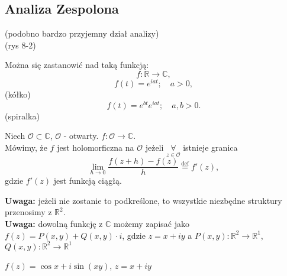 \documentclass[../main.tex]{subfiles}
\begin{document}
\subsection{Analiza Zespolona}
(podobno bardzo przyjemny dział analizy)\\
(rys 8-2)

Można się zastanowić nad taką funkcją:
\[
f : \mathbb{R}\to \mathbb{C}
,\]
\[
    f(t) = e^{iat};\quad a > 0
,\]
(kółko)
\[
    f(t) = e^{bt}e^{iat};\quad a, b > 0
.\]
(spiralka)
\begin{definicja}
    Niech $\mathcal{O}\subset\mathbb{C}$, $\mathcal{O}$ - otwarty.
    $f : \mathcal{O}\to \mathbb{C}$. \\
    Mówimy, że $f$ jest holomorficzna na $\mathcal{O}$ jeżeli $\underset{z\in \mathcal{O}}{\forall}$ istnieje granica
    \[
        \lim_{h \to 0}\frac{f(z+h) - f(z)}{h} \overset{\text{def}}{=} f'(z)
    ,\]
gdzie $f'(z)$ jest funkcją ciągłą.
\end{definicja}
\textbf{Uwaga:} jeżeli nie zostanie to podkreślone, to wszystkie niezbędne struktury przenosimy z $\mathbb{R}^2$.\\
\textbf{Uwaga:} dowolną funkcję z $\mathbb{C}$ możemy zapisać jako $f(z) = P(x,y) + Q(x,y)\cdot i$, gdzie $z = x + iy$ a $P(x,y): \mathbb{R}^2\to \mathbb{R}^1$, $Q(x,y) : \mathbb{R}^2 \to \mathbb{R}^1$
\begin{przyklad}
    $f(z) = \cos x + i \sin(xy)$, $z = x + iy$
\end{przyklad}
\end{document}
